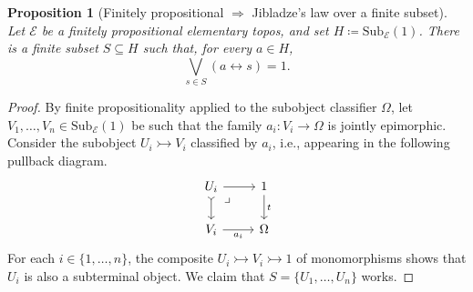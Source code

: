 \documentclass[12pt]{amsart}
\theoremstyle{plain}
\newtheorem{proposition}[theorem]{Proposition}
\theoremstyle{definition}
\newcommand{\E}{\mathcal{E}}
\newcommand{\Sub}{\mathrm{Sub}}
\begin{document}
\begin{proposition}[Finitely propositional $\Rightarrow$ Jibladze's law over a finite subset]\label{prop: weak etale condition}
    Let $\E$ be a finitely propositional elementary topos, and set $H \coloneqq \Sub_\E(1)$. There is a finite subset $S\subseteq H$ such that, for every $a\in H$,
    \[
    \bigvee_{s\in S} (a\leftrightarrow s) =1.
    \]
\end{proposition}

\begin{proof}
    By finite propositionality applied to the subobject classifier $\Omega$, let $V_1,\dots, V_n\in \Sub_\E(1)$ be such that the family $a_i\colon V_i\to \Omega$ is jointly epimorphic. Consider the subobject $U_i\rightarrowtail V_i$ classified by $a_i$, i.e., appearing in the following pullback diagram.
    \begin{equation}\label{pbb1}
        \begin{tikzcd}
        	{U_i} \arrow[dr, phantom, very near start, "\lrcorner"] & 1 
            \\
        	{V_i} & \Omega
        	\arrow[from=1-1, to=1-2]
        	\arrow[tail, from=1-1, to=2-1]
        	\arrow["t", from=1-2, to=2-2]
        	\arrow["{a_i}"', from=2-1, to=2-2]
        \end{tikzcd}
    \end{equation}
    For each $i \in \{1, \dots, n\}$, the composite $U_i\rightarrowtail V_i\rightarrowtail 1$ of monomorphisms shows that $U_i$ is also a subterminal object. We claim that $S=\{U_1,\dots, U_n\}$ works. 
    

\end{proof}
\end{document}
